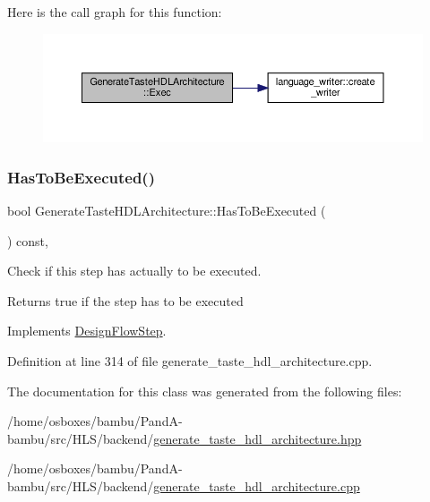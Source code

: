 Here is the call graph for this function\+:
\nopagebreak
\begin{figure}[H]
\begin{center}
\leavevmode
\includegraphics[width=350pt]{dc/d21/classGenerateTasteHDLArchitecture_a6d92a9a5da5f96e8de1f4a2fab12c572_cgraph}
\end{center}
\end{figure}
\mbox{\label{classGenerateTasteHDLArchitecture_ab7fb74172594a37df64a99f0afecc5da}} 
\subsubsection{\texorpdfstring{Has\+To\+Be\+Executed()}{HasToBeExecuted()}}
{\footnotesize\ttfamily bool Generate\+Taste\+H\+D\+L\+Architecture\+::\+Has\+To\+Be\+Executed (\begin{DoxyParamCaption}{ }\end{DoxyParamCaption}) const\hspace{0.3cm}{\ttfamily [override]}, {\ttfamily [virtual]}}



Check if this step has actually to be executed. 

\begin{DoxyReturn}{Returns}
true if the step has to be executed 
\end{DoxyReturn}


Implements \hyperlink{classDesignFlowStep_a1783abe0c1d162a52da1e413d5d1ef05}{Design\+Flow\+Step}.



Definition at line 314 of file generate\+\_\+taste\+\_\+hdl\+\_\+architecture.\+cpp.



The documentation for this class was generated from the following files\+:\begin{DoxyCompactItemize}
\item 
/home/osboxes/bambu/\+Pand\+A-\/bambu/src/\+H\+L\+S/backend/\hyperlink{generate__taste__hdl__architecture_8hpp}{generate\+\_\+taste\+\_\+hdl\+\_\+architecture.\+hpp}\item 
/home/osboxes/bambu/\+Pand\+A-\/bambu/src/\+H\+L\+S/backend/\hyperlink{generate__taste__hdl__architecture_8cpp}{generate\+\_\+taste\+\_\+hdl\+\_\+architecture.\+cpp}\end{DoxyCompactItemize}

